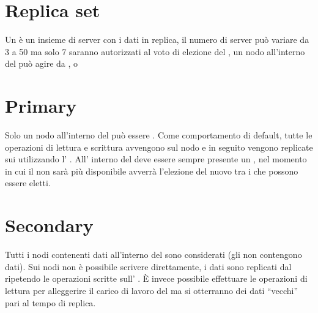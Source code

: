 \documentclass[a4paper,10pt,english]{sphinxmanual}
\begin{document}
\section{Replica set}
\label{cluster_architecture/architecture:replica-set}\label{cluster_architecture/architecture:id6}
Un  è un insieme di server  con i dati in replica, il numero di server
può variare da 3 a 50 ma solo 7 saranno autorizzati al voto di elezione del {\hyperref[cluster_architecture/architecture:primary]{\emph{}}}, un
nodo all'interno del  può agire da {\hyperref[cluster_architecture/architecture:primary]{\emph{}}}, {\hyperref[cluster_architecture/architecture:secondary]{\emph{}}} o
{\hyperref[cluster_architecture/architecture:arbiter]{\emph{}}}


\section{Primary}
\label{cluster_architecture/architecture:id7}\label{cluster_architecture/architecture:primary}
Solo un nodo all'interno del {\hyperref[cluster_architecture/architecture:replica-set]{\emph{}}} può essere .
Come comportamento di default, tutte le operazioni di lettura e scrittura avvengono sul nodo
 e in seguito vengono replicate sui {\hyperref[cluster_architecture/architecture:secondary]{\emph{}}} utilizzando l' .
All' interno del {\hyperref[cluster_architecture/architecture:replica-set]{\emph{}}} deve essere sempre presente un , nel momento in cui
il  non sarà più disponibile avverrà l'elezione del nuovo  tra i
{\hyperref[cluster_architecture/architecture:secondary]{\emph{}}} che possono essere eletti.


\section{Secondary}
\label{cluster_architecture/architecture:id8}\label{cluster_architecture/architecture:secondary}
Tutti i nodi contenenti dati all'interno del {\hyperref[cluster_architecture/architecture:replica-set]{\emph{}}} sono considerati 
(gli {\hyperref[cluster_architecture/architecture:arbiter]{\emph{}}} non contengono dati).
Sui nodi  non è possibile scrivere direttamente, i dati sono replicati dal
{\hyperref[cluster_architecture/architecture:primary]{\emph{}}} ripetendo le operazioni scritte sull' .
È invece possibile effettuare le operazioni di lettura per alleggerire il carico di lavoro del
{\hyperref[cluster_architecture/architecture:primary]{\emph{}}} ma si otterranno dei dati ``vecchi'' pari al tempo di replica.
\end{document}
